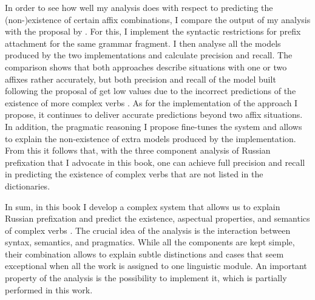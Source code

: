 In order to see how well my analysis does with respect to predicting the \mbox{(non-)}\linebreak[3]existence of certain affix combinations, I compare the output of my analysis with the proposal by \citet{Tatevosov:09}. For this, I implement the syntactic restrictions for prefix attachment for the same grammar fragment. I then analyse all the models produced by the two implementations and calculate precision and recall. The comparison  shows that both approaches describe situations with one or two affixes rather accurately, but both precision and recall of the model built following the proposal of \citet{Tatevosov:09} get low values due to the incorrect predictions of the existence of more complex verbs . As for the implementation of the approach I propose, it continues to deliver accurate predictions beyond two affix situations. In addition, the pragmatic reasoning I propose fine-tunes the system and allows to explain the non-existence of extra models produced by the implementation. From this it follows that, with the three component analysis of Russian prefixation  that I advocate in this book, one can achieve full precision and recall in predicting the existence of complex verbs  that are not listed in the dictionaries.\largerpage

In sum, in this book I develop a complex system that allows us to explain Russian prefixation  and predict the existence, aspectual properties, and semantics of complex verbs . The crucial idea of the analysis is the interaction between syntax, semantics, and pragmatics. While all the components are kept simple, their combination allows to explain subtle distinctions and cases that seem exceptional when all the work is assigned to one linguistic module. An important property of the analysis is the possibility to implement it, which is partially performed in this work.

